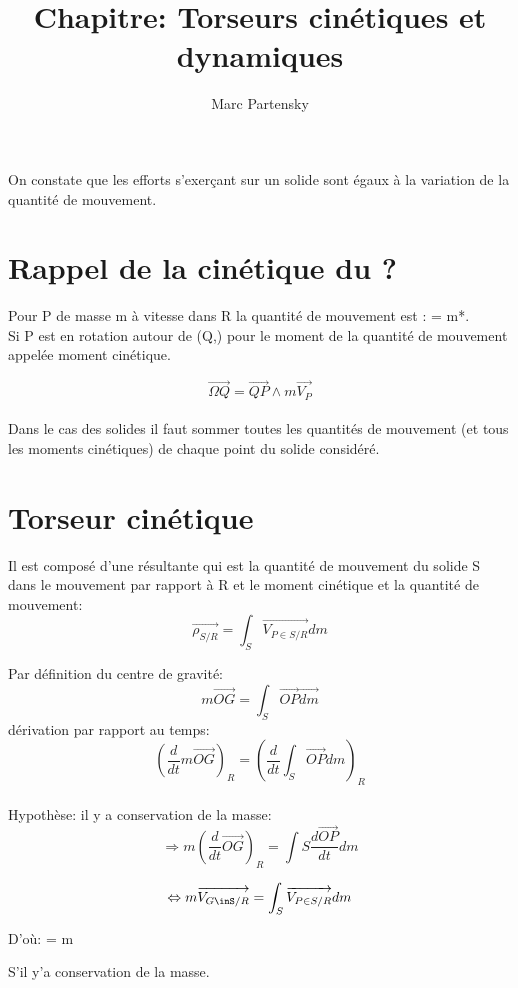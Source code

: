 \documentclass{article}
\title{\vspace{-5cm}Chapitre: Torseurs cinétiques et dynamiques}
\author{Marc Partensky}
\begin{document}
\maketitle

On constate que les efforts s'exerçant sur un solide sont égaux à la variation de la quantité de mouvement.

\section{Rappel de la cinétique du ?}

Pour P de masse m à vitesse  dans R la quantité de mouvement est : \overrightarrow{\rho} = m*. \\

Si P est en rotation autour de (Q,) pour le moment de la quantité de mouvement appelée moment cinétique.

$$\overrightarrow{\Omega Q} = \overrightarrow{QP} \wedge m\overrightarrow{V_{P}}$$ \\

Dans le cas des solides il faut sommer toutes les quantités de mouvement (et tous les moments cinétiques) de chaque point du solide considéré.\hfill\break

\section{Torseur cinétique}
Il est composé d'une résultante qui est la quantité de mouvement du solide S dans le mouvement par rapport à R et le moment cinétique et la quantité de mouvement:
$$\overrightarrow{\rho_{S/R}}=\int_{S}\overrightarrow{V_{P\in S/R}} dm$$

Par définition du centre de gravité:\\ $$m\overrightarrow{OG}=\int_{S}\overrightarrow{OP}\overrightarrow{dm}$$
dérivation par rapport au temps:
$$(\frac{d}{dt}m\overrightarrow{OG})_{R} = (\frac{d}{dt}\int_{S}\overrightarrow{OP}dm)_{R}$$ \\

Hypothèse: il y a conservation de la masse:\\

$$\Rightarrow m(\frac{d}{dt}\overrightarrow{OG})_{R} = \int{S}\frac{d\overrightarrow{OP}}{dt}dm$$

$$\Leftrightarrow m\overrightarrow{V_{G\inS/R}} = \int_{S}\overrightarrow{V_{P\in{S/R}}}dm$$

D'où:  = m

S'il y'a conservation de la masse.
\end{document}
